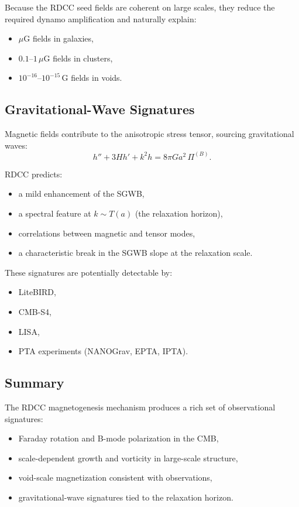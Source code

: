 \documentclass[11pt,a4paper]{article}
\begin{document}
Because the RDCC seed fields are coherent on large scales, they reduce the required dynamo
amplification and naturally explain:
\begin{itemize}
\item $\mu$G fields in galaxies,
\item $0.1$–$1\,\mu$G fields in clusters,
\item $10^{-16}$–$10^{-15}$\,G fields in voids.
\end{itemize}

\subsection{Gravitational-Wave Signatures}

Magnetic fields contribute to the anisotropic stress tensor, sourcing gravitational waves:
\begin{equation}
h'' + 3Hh' + k^{2}h
=
8\pi G a^{2}\,\Pi^{(B)}.
\end{equation}

RDCC predicts:
\begin{itemize}
\item a mild enhancement of the SGWB,
\item a spectral feature at $k \sim T(a)$ (the relaxation horizon),
\item correlations between magnetic and tensor modes,
\item a characteristic break in the SGWB slope at the relaxation scale.
\end{itemize}

These signatures are potentially detectable by:
\begin{itemize}
\item LiteBIRD,
\item CMB-S4,
\item LISA,
\item PTA experiments (NANOGrav, EPTA, IPTA).
\end{itemize}

\subsection{Summary}

The RDCC magnetogenesis mechanism produces a rich set of observational signatures:
\begin{itemize}
\item Faraday rotation and B-mode polarization in the CMB,
\item scale-dependent growth and vorticity in large-scale structure,
\item void-scale magnetization consistent with observations,
\item gravitational-wave signatures tied to the relaxation horizon.
\end{itemize}
\end{document}
